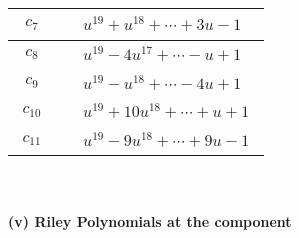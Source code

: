 \documentclass[1p]{elsarticle_modified}
\theoremstyle{definition}
\begin{document}
\begin{tabular}{m{50pt}|m{274pt}}
\hline $$\begin{aligned}c_{7}\end{aligned}$$&$\begin{aligned}
&u^{19}+u^{18}+\cdots+3 u-1
\end{aligned}$\\
\hline $$\begin{aligned}c_{8}\end{aligned}$$&$\begin{aligned}
&u^{19}-4 u^{17}+\cdots- u+1
\end{aligned}$\\
\hline $$\begin{aligned}c_{9}\end{aligned}$$&$\begin{aligned}
&u^{19}- u^{18}+\cdots-4 u+1
\end{aligned}$\\
\hline $$\begin{aligned}c_{10}\end{aligned}$$&$\begin{aligned}
&u^{19}+10 u^{18}+\cdots+u+1
\end{aligned}$\\
\hline $$\begin{aligned}c_{11}\end{aligned}$$&$\begin{aligned}
&u^{19}-9 u^{18}+\cdots+9 u-1
\end{aligned}$\\
\hline
\end{tabular}\\~\\
\newpage\renewcommand{\arraystretch}{1}
\flushleft \textbf{(v) Riley Polynomials at the component}\newline \\
\end{document}
